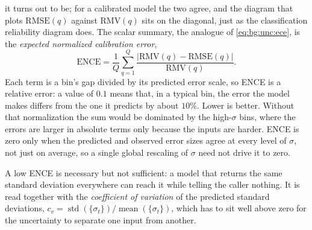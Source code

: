         it turns out to be; for a calibrated model the two agree, and the diagram that
        plots $\mathrm{RMSE}(q)$ against $\mathrm{RMV}(q)$ sits on the diagonal, just as
        the classification reliability diagram does. The scalar summary, the analogue of
        \eqref{eq:bg:unc:ece}, is the \emph{expected normalized calibration error},
        \begin{equation}
            \mathrm{ENCE} = \frac{1}{Q} \sum_{q=1}^{Q}
            \frac{\bigl\lvert \mathrm{RMV}(q) - \mathrm{RMSE}(q) \bigr\rvert}{\mathrm{RMV}(q)} .
            \label{eq:bg:unc:ence}
        \end{equation}
        Each term is a bin's gap divided by its predicted error scale, so ENCE is a
        relative error: a value of $0.1$ means that, in a typical bin, the error the
        model makes differs from the one it predicts by about $10\%$. Lower is better.
        Without that
        normalization the sum would be dominated by the high-$\sigma$ bins, where the
        errors are larger in absolute terms only because the inputs are harder. ENCE
        is zero only when the predicted and observed error sizes agree at every level
        of $\sigma$, not just on average, so a single global rescaling of $\sigma$
        need not drive it to zero.

        A low ENCE is necessary but not sufficient: a model that returns the same
        standard deviation everywhere can reach it while telling the caller nothing. It
        is read together with the \emph{coefficient of variation} of the predicted
        standard deviations,
        $c_v = \operatorname{std}(\{\sigma_t\}) / \operatorname{mean}(\{\sigma_t\})$,
        which has to sit well above zero for the uncertainty to separate one input from
        another.
        
